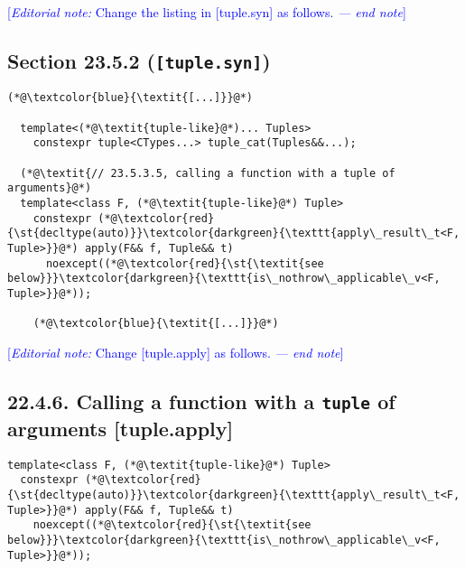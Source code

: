 \documentclass{article}
\begin{document}
\textcolor{blue}{[\textit{Editorial note:} Change the listing in [tuple.syn] as follows. \textit{--- end note}]}

\subsection*{Section 23.5.2 (\texttt{[tuple.syn]})}
\begin{lstlisting}[style=base]
    (*@\textcolor{blue}{\textit{[...]}}@*)

  template<(*@\textit{tuple-like}@*)... Tuples>
    constexpr tuple<CTypes...> tuple_cat(Tuples&&...);

  (*@\textit{// 23.5.3.5, calling a function with a tuple of arguments}@*)
  template<class F, (*@\textit{tuple-like}@*) Tuple>
    constexpr (*@\textcolor{red}{\st{decltype(auto)}}\textcolor{darkgreen}{\texttt{apply\_result\_t<F, Tuple>}}@*) apply(F&& f, Tuple&& t)
      noexcept((*@\textcolor{red}{\st{\textit{see below}}}\textcolor{darkgreen}{\texttt{is\_nothrow\_applicable\_v<F, Tuple>}}@*));

    (*@\textcolor{blue}{\textit{[...]}}@*)
\end{lstlisting}

\textcolor{blue}{[\textit{Editorial note:} Change [tuple.apply] as follows. \textit{--- end note}]}

\subsection*{22.4.6. Calling a function with a \texttt{tuple} of arguments [tuple.apply]}
\begin{lstlisting}
template<class F, (*@\textit{tuple-like}@*) Tuple>
  constexpr (*@\textcolor{red}{\st{decltype(auto)}}\textcolor{darkgreen}{\texttt{apply\_result\_t<F, Tuple>}}@*) apply(F&& f, Tuple&& t)
    noexcept((*@\textcolor{red}{\st{\textit{see below}}}\textcolor{darkgreen}{\texttt{is\_nothrow\_applicable\_v<F, Tuple>}}@*));
\end{lstlisting}
\end{document}
